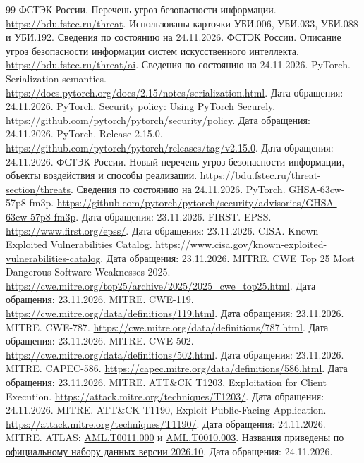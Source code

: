 \documentclass[12pt,a4paper]{report}
\begin{document}
\begin{thebibliography}{99}
 ФСТЭК России. Перечень угроз безопасности информации. \url{https://bdu.fstec.ru/threat}. Использованы карточки УБИ.006, УБИ.033, УБИ.088 и УБИ.192. Сведения по состоянию на 24.11.2026.
 ФСТЭК России. Описание угроз безопасности информации систем искусственного интеллекта. \url{https://bdu.fstec.ru/threat/ai}. Сведения по состоянию на 24.11.2026.
 PyTorch. Serialization semantics. \url{https://docs.pytorch.org/docs/2.15/notes/serialization.html}. Дата обращения: 24.11.2026.
 PyTorch. Security policy: Using PyTorch Securely. \url{https://github.com/pytorch/pytorch/security/policy}. Дата обращения: 24.11.2026.
 PyTorch. Release 2.15.0. \url{https://github.com/pytorch/pytorch/releases/tag/v2.15.0}. Дата обращения: 24.11.2026.
 ФСТЭК России. Новый перечень угроз безопасности информации, объекты воздействия и способы реализации. \url{https://bdu.fstec.ru/threat-section/threats}. Сведения по состоянию на 24.11.2026.
 PyTorch. GHSA-63cw-57p8-fm3p. \url{https://github.com/pytorch/pytorch/security/advisories/GHSA-63cw-57p8-fm3p}. Дата обращения: 23.11.2026.
 FIRST. EPSS. \url{https://www.first.org/epss/}. Дата обращения: 23.11.2026.
 CISA. Known Exploited Vulnerabilities Catalog. \url{https://www.cisa.gov/known-exploited-vulnerabilities-catalog}. Дата обращения: 23.11.2026.
 MITRE. CWE Top 25 Most Dangerous Software Weaknesses 2025. \url{https://cwe.mitre.org/top25/archive/2025/2025_cwe_top25.html}. Дата обращения: 23.11.2026.
 MITRE. CWE-119. \url{https://cwe.mitre.org/data/definitions/119.html}. Дата обращения: 23.11.2026.
 MITRE. CWE-787. \url{https://cwe.mitre.org/data/definitions/787.html}. Дата обращения: 23.11.2026.
 MITRE. CWE-502. \url{https://cwe.mitre.org/data/definitions/502.html}. Дата обращения: 23.11.2026.
 MITRE. CAPEC-586. \url{https://capec.mitre.org/data/definitions/586.html}. Дата обращения: 23.11.2026.
 MITRE. ATT\&CK T1203, Exploitation for Client Execution. \url{https://attack.mitre.org/techniques/T1203/}. Дата обращения: 24.11.2026.
 MITRE. ATT\&CK T1190, Exploit Public-Facing Application. \url{https://attack.mitre.org/techniques/T1190/}. Дата обращения: 24.11.2026.
 MITRE. ATLAS: \href{https://atlas.mitre.org/techniques/AML.T0011.000}{AML.T0011.000} и \href{https://atlas.mitre.org/techniques/AML.T0010.003}{AML.T0010.003}. Названия приведены по \href{https://github.com/mitre-atlas/atlas-data/blob/main/dist/v6/ATLAS-2026.10.yaml}{официальному набору данных версии 2026.10}. Дата обращения: 24.11.2026.

\end{thebibliography}
\end{document}
